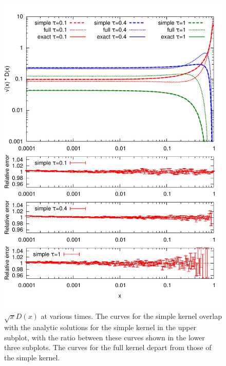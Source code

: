 \documentclass[a4paper,12pt]{article}
\numberwithin{equation}{section}
\begin{document}



\begin{figure}
\centering
\includegraphics[width=0.9\linewidth]{times.pdf}
\vspace*{-20pt}
\caption{$\sqrt{x} D(x)$ at various times. The curves for the simple kernel overlap with the analytic solutions for the simple kernel in the upper subplot, with the ratio between these curves shown in the lower three subplots. The curves for the full kernel depart from those of the simple kernel.}\label{Dtimes}
\end{figure}
\end{document}
